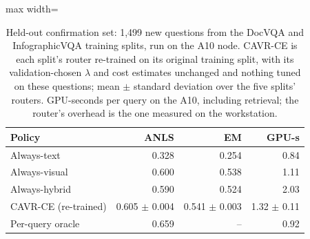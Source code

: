 \begin{table}[t]
\centering
\caption{Held-out confirmation set: 1,499 new questions from the DocVQA and InfographicVQA training splits, run on the A10 node. CAVR-CE is each split's router re-trained on its original training split, with its validation-chosen $\lambda$ and cost estimates unchanged and nothing tuned on these questions; mean $\pm$ standard deviation over the five splits' routers. GPU-seconds per query on the A10, including retrieval; the router's overhead is the one measured on the workstation.}
\label{tab:confirmation}
\begin{adjustbox}{max width=\linewidth}
\begin{tabular}{lrrr}
\toprule
\textbf{Policy} & \textbf{ANLS} & \textbf{EM} & \textbf{GPU-s} \\
\midrule
Always-text & 0.328 & 0.254 & 0.84 \\
Always-visual & 0.600 & 0.538 & 1.11 \\
Always-hybrid & 0.590 & 0.524 & 2.03 \\
CAVR-CE (re-trained) & 0.605 $\pm$ 0.004 & 0.541 $\pm$ 0.003 & 1.32 $\pm$ 0.11 \\
Per-query oracle & 0.659 & -- & 0.92 \\
\bottomrule
\end{tabular}
\end{adjustbox}
\end{table}
